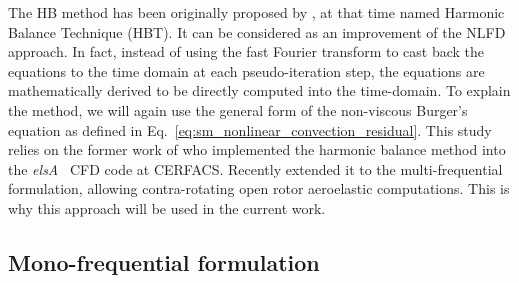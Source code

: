 
The HB method has been originally
proposed by \citet{Hall2002}, at that time named
Harmonic Balance Technique (HBT).
It can be considered as an improvement of the NLFD
approach. In fact, instead
of using the fast Fourier transform to cast back the equations
to the time domain at each pseudo-iteration step, 
the equations are mathematically derived to be directly
computed into the time-domain.
To explain the method, we will again use the general form of 
the non-viscous Burger's equation as defined in
Eq.~\eqref{eq:sm_nonlinear_convection_residual}.
This study relies on the former work of \citet{ThesisSicot} who
implemented the harmonic balance method into the 
\textit{elsA}~\cite{Cambier2013} CFD code at CERFACS. 
Recently \citet{ThesisGuedeney} extended it to the
multi-frequential formulation, allowing contra-rotating
open rotor aeroelastic computations. This is why this
approach will be used in the current work.

\subsection{Mono-frequential formulation}

